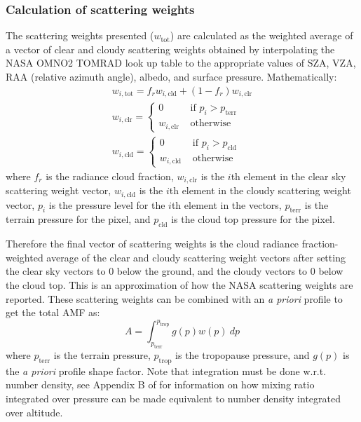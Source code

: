 \documentclass[12pt]{article}
\begin{document}
	\subsubsection{Calculation of scattering weights}
	The scattering weights presented ($w_{\mathrm{tot}}$) are calculated as the weighted average of a vector of clear and cloudy scattering weights obtained by interpolating the NASA OMNO2 TOMRAD look up table to the appropriate values of SZA, VZA, RAA (relative azimuth angle), albedo, and surface pressure. Mathematically:
	\begin{align}
		w_{i, \mathrm{tot}} = f_r w_{i, \mathrm{cld}} + (1 - f_r) w_{i, \mathrm{clr}} \label{eqn-pubSW}\\
		w_{i, \mathrm{clr}} = \left\lbrace 
			\begin{matrix}
				0 & \text{ if } p_i > p_\mathrm{terr} \\
				w_{i, \mathrm{clr}} & \text{ otherwise }
			\end{matrix}\right. \\
		w_{i, \mathrm{cld}} = \left\lbrace 
			\begin{matrix} 
				0 & \text{ if } p_i > p_\mathrm{cld} \\
				w_{i, \mathrm{cld}} & \text{ otherwise }
			\end{matrix}\right. \label{eqn-cldSW}
	\end{align}
	where $f_r$ is the radiance cloud fraction, $w_{i, \mathrm{clr}}$ is the $i$th element in the clear sky scattering weight vector, $w_{i, \mathrm{cld}}$ is the $i$th element in the cloudy scattering weight vector, $p_i$ is the pressure level for the $i$th element in the vectors, $p_\mathrm{terr}$ is the terrain pressure for the pixel, and $p_\mathrm{cld}$ is the cloud top pressure for the pixel.
	
	Therefore the final vector of scattering weights is the cloud radiance fraction-weighted average of the clear and cloudy scattering weight vectors after setting the clear sky vectors to 0 below the ground, and the cloudy vectors to 0 below the cloud top.  This is an approximation of how the NASA scattering weights are reported.  These scattering weights can be combined with an \emph{a priori}  profile to get the total AMF as:
	\begin{equation}
		A = \int_{p_\mathrm{terr}}^{p_\mathrm{trop}} g(p) w(p) \: dp
	\end{equation}
	where $p_\mathrm{terr}$ is the terrain pressure, $p_\mathrm{trop}$ is the tropopause pressure, and $g(p)$ is the \emph{a priori} profile shape factor. Note that integration must be done w.r.t. number density, see Appendix B of \citet{ziemka01} for information on how mixing ratio integrated over pressure can be made equivalent to number density integrated over altitude.
	
\end{document}
